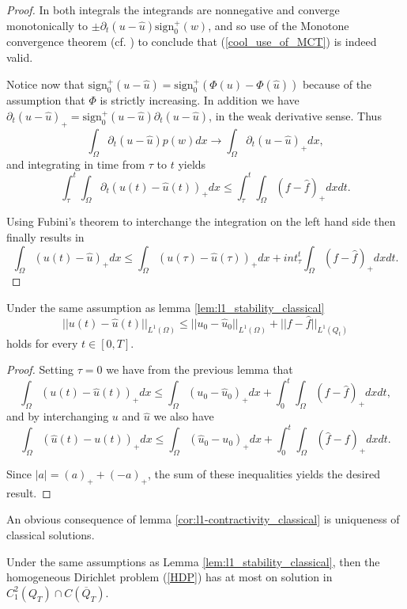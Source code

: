 \documentclass[11pt, a4paper]{article}
\begin{document}
\begin{proof}
In both integrals the integrands are nonnegative and converge monotonically to $\pm \partial_t (u - \hat{u})\mathrm{sign}^+_0(w)$, and so use of the Monotone convergence theorem (cf. \citep[Thm. 5.6, p. 165]{weiss1999course}) to conclude that (\ref{cool_use_of_MCT}) is indeed valid.


Notice now that $\mathrm{sign}_0^+(u-\hat{u}) = \mathrm{sign}_0^+(\Phi(u) - \Phi(\hat{u}))$ because of the assumption that $\Phi$ is strictly increasing. In addition we have $\partial_t (u-\hat{u})_+ = \mathrm{sign}_0^+(u-\hat{u}) \partial_t (u - \hat{u})$, in the weak derivative sense. Thus
\begin{equation*}
\int_\Omega \partial_t(u-\hat{u})p(w) dx \to \int_\Omega \partial_t (u-\hat{u})_+ dx,
\end{equation*}
and integrating in time from $\tau$ to $t$ yields
\begin{equation*}
\int_\tau^t \int_{\Omega}\partial_t(u(t)-\hat{u}(t))_+dx \leq \int_\tau^t\int_{\Omega}(f-\hat{f})_+dxdt.
\end{equation*}

Using Fubini's theorem to interchange the integration on the left hand side then finally results in
\begin{equation}
\int_\Omega (u(t) - \hat{u})_+ dx \leq \int_\Omega (u(\tau) - \hat{u}(\tau))_+ dx + int_\tau^t \int_\Omega (f-\hat{f})_+ dxdt.
\end{equation}
\end{proof}


\begin{cor}[$L^1$-contractivity]
\label{cor:l1-contractivity_classical}
Under the same assumption as lemma \ref{lem:l1_stability_classical}
\begin{equation}
\label{l1_contractivity}
||u(t) - \hat{u}(t)||_{L^1(\Omega)} \leq ||u_0 - \hat{u}_0||_{L^1(\Omega)} + ||f-\hat{f}||_{L^1(Q_t)}
\end{equation}
holds for every $t\in [0,T]$.
\end{cor}

\begin{proof}
Setting $\tau = 0$ we have from the previous lemma that
\begin{equation*}
\int_\Omega  (u(t)-\hat{u}(t))_+dx \leq \int_\Omega (u_0 - \hat{u}_0)_+dx + \int_0^t \int_\Omega (f-\hat{f})_+ dxdt,
\end{equation*}
and by interchanging $u$ and $\hat{u}$ we also have 
\begin{equation*}
\int_\Omega  (\hat{u}(t)-u(t))_+dx \leq \int_\Omega (\hat{u}_0 - u_0)_+dx + \int_0^t \int_\Omega (\hat{f}-f)_+ dxdt.
\end{equation*}

Since $|a| = (a)_+ + (-a)_+$, the sum of these inequalities yields the desired result.
\end{proof}
An obvious consequence of lemma \ref{cor:l1-contractivity_classical} is uniqueness of classical solutions.
\begin{cor}
Under the same assumptions as Lemma \ref{lem:l1_stability_classical}, then the homogeneous Dirichlet problem (\ref{HDP}) has at most on solution in $C^2_1(Q_T)\cap C(\overline{Q}_T)$.
\end{cor}
\end{document}
